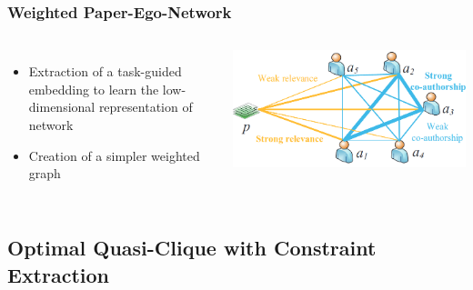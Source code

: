 \begin{frame}
\frametitle{Weighted Paper-Ego-Network}
\begin{columns}

\begin{itemize}
    \item Extraction of a task-guided embedding to learn the low-dimensional representation of network
    \item Creation of a simpler weighted graph
\end{itemize}

\includegraphics[width=1\linewidth]{img/paper-ego}


\end{columns}
\end{frame}
\subsection{Optimal Quasi-Clique with Constraint Extraction}

